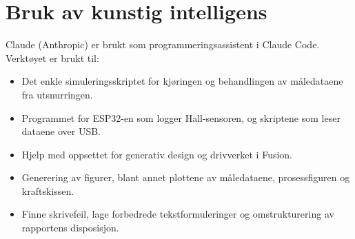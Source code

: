 \newpage
\section{Bruk av kunstig intelligens}
\label{sec:ki}
Claude (Anthropic) er brukt som programmeringsassistent i Claude Code. Verktøyet er brukt til:
\begin{itemize}
    \item Det enkle simuleringsskriptet for kjøringen og behandlingen av måledataene fra utsnurringen.
    \item Programmet for ESP32-en som logger Hall-sensoren, og skriptene som leser dataene over USB.
    \item Hjelp med oppsettet for generativ design og drivverket i Fusion.
    \item Generering av figurer, blant annet plottene av måledataene, prosessfiguren og kraftskissen.
    \item Finne skrivefeil, lage forbedrede tekstformuleringer og omstrukturering av rapportens disposisjon.
\end{itemize}


